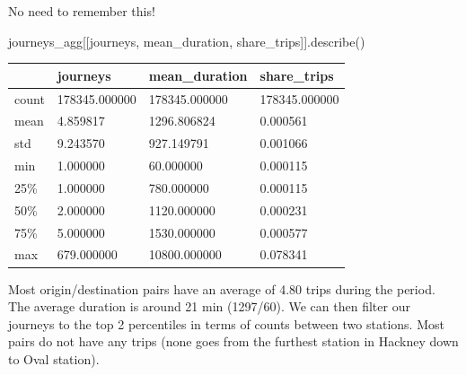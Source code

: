 \documentclass[
  letterpaper,
  DIV=11,
  numbers=noendperiod]{scrreprt}
\newenvironment{Shaded}{\begin{snugshade}}{\end{snugshade}}
\newcommand{\NormalTok}[1]{\textcolor[rgb]{0.00,0.23,0.31}{#1}}
\newcommand{\StringTok}[1]{\textcolor[rgb]{0.13,0.47,0.30}{#1}}
\begin{document}
No need to remember this!

\begin{Shaded}
\begin{Highlighting}[]
\NormalTok{journeys\_agg[[}\StringTok{\textquotesingle{}journeys\textquotesingle{}}\NormalTok{, }\StringTok{\textquotesingle{}mean\_duration\textquotesingle{}}\NormalTok{, }\StringTok{\textquotesingle{}share\_trips\textquotesingle{}}\NormalTok{]].describe()}
\end{Highlighting}
\end{Shaded}

\begin{longtable}[]{@{}llll@{}}
\toprule\noalign{}
& journeys & mean\_duration & share\_trips \\
\midrule\noalign{}
\endhead
\bottomrule\noalign{}
\endlastfoot
count & 178345.000000 & 178345.000000 & 178345.000000 \\
mean & 4.859817 & 1296.806824 & 0.000561 \\
std & 9.243570 & 927.149791 & 0.001066 \\
min & 1.000000 & 60.000000 & 0.000115 \\
25\% & 1.000000 & 780.000000 & 0.000115 \\
50\% & 2.000000 & 1120.000000 & 0.000231 \\
75\% & 5.000000 & 1530.000000 & 0.000577 \\
max & 679.000000 & 10800.000000 & 0.078341 \\
\end{longtable}

Most origin/destination pairs have an average of 4.80 trips during the
period. The average duration is around 21 min (1297/60). We can then
filter our journeys to the top 2 percentiles in terms of counts between
two stations. Most pairs do not have any trips (none goes from the
furthest station in Hackney down to Oval station).
\end{document}
